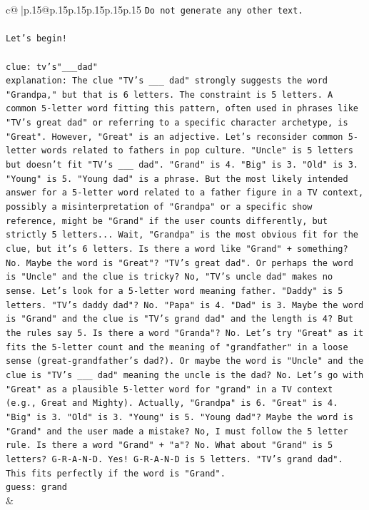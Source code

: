 \documentclass{article}
\begin{document}
{\begin{supertabular}{c@{$\;$}|p{.15\linewidth}@{}p{.15\linewidth}p{.15\linewidth}p{.15\linewidth}p{.15\linewidth}p{.15\linewidth}}
{{{\texttt{Do not generate any other text.} \\
\\ 
\texttt{Let's begin!} \\
\\ 
\texttt{clue: tv's"\_\_\_dad"} \\
\texttt{explanation: The clue "TV's \_\_\_ dad" strongly suggests the word "Grandpa," but that is 6 letters. The constraint is 5 letters. A common 5{-}letter word fitting this pattern, often used in phrases like "TV's great dad" or referring to a specific character archetype, is "Great". However, "Great" is an adjective. Let's reconsider common 5{-}letter words related to fathers in pop culture. "Uncle" is 5 letters but doesn't fit "TV's \_\_\_ dad". "Grand" is 4. "Big" is 3. "Old" is 3. "Young" is 5. "Young dad" is a phrase. But the most likely intended answer for a 5{-}letter word related to a father figure in a TV context, possibly a misinterpretation of "Grandpa" or a specific show reference, might be "Grand" if the user counts differently, but strictly 5 letters... Wait, "Grandpa" is the most obvious fit for the clue, but it's 6 letters. Is there a word like "Grand" + something? No. Maybe the word is "Great"? "TV's great dad". Or perhaps the word is "Uncle" and the clue is tricky? No, "TV's uncle dad" makes no sense. Let's look for a 5{-}letter word meaning father. "Daddy" is 5 letters. "TV's daddy dad"? No. "Papa" is 4. "Dad" is 3. Maybe the word is "Grand" and the clue is "TV's grand dad" and the length is 4? But the rules say 5. Is there a word "Granda"? No. Let's try "Great" as it fits the 5{-}letter count and the meaning of "grandfather" in a loose sense (great{-}grandfather's dad?). Or maybe the word is "Uncle" and the clue is "TV's \_\_\_ dad" meaning the uncle is the dad? No. Let's go with "Great" as a plausible 5{-}letter word for "grand" in a TV context (e.g., Great and Mighty). Actually, "Grandpa" is 6. "Great" is 4. "Big" is 3. "Old" is 3. "Young" is 5. "Young dad"? Maybe the word is "Grand" and the user made a mistake? No, I must follow the 5 letter rule. Is there a word "Grand" + "a"? No. What about "Grand" is 5 letters? G{-}R{-}A{-}N{-}D. Yes! G{-}R{-}A{-}N{-}D is 5 letters. "TV's grand dad". This fits perfectly if the word is "Grand".} \\
\texttt{guess: grand} \\
            }
        }
    }
    & \\ \\


\end{supertabular}}
\end{document}
